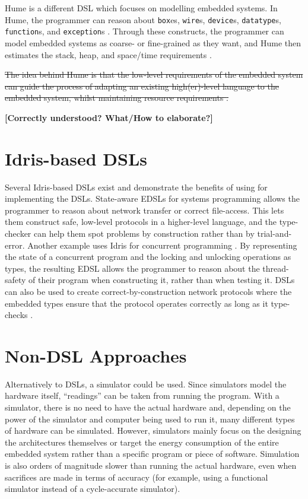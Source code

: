 	Hume \cite{10.1007/978-3-540-39815-8_3} is a different DSL which focuses on modelling embedded systems. In Hume, the programmer can reason about \texttt{box}es, \texttt{wire}s, \texttt{device}s, \texttt{datatype}s, \texttt{function}s, and \texttt{exception}s \cite{10.1007/978-3-540-39815-8_3}. Through these constructs, the programmer can model embedded systems as coarse- or fine-grained as they want, and Hume then estimates the stack, heap, and space/time requirements \cite{10.1007/978-3-540-39815-8_3}.
    
    \sout{The idea behind Hume is that the low-level requirements of the embedded system can guide the process of adapting an existing high(er)-level language to the embedded system, whilst maintaining resource requirements \cite{10.1007/978-3-540-39815-8_3}.}
    
    \textbf{[Correctly understood? What/How to elaborate?]}

\section{Idris-based DSLs}
	Several Idris-based DSLs exist and demonstrate the benefits of using \Idris for implementing the DSLs. State-aware EDSLs for systems programming \cite{10.1007/978-3-642-27694-1_18} allows the programmer to reason about network transfer or correct file-access. This lets them construct safe, low-level protocols in a higher-level language, and the type-checker can help them spot problems by construction \cite{10.1007/978-3-642-27694-1_18} rather than by trial-and-error.
	Another example uses Idris for concurrent programming \cite{brady2010correct}. By representing the state of a concurrent program and the locking and unlocking operations as types, the resulting EDSL allows the programmer to reason about the thread-safety of their program when constructing it, rather than when testing it.
	DSLs can also be used to create correct-by-construction network protocols where the embedded types ensure that the protocol operates correctly as long as it type-checks \cite{5158855}.

\section{Non-DSL Approaches}
	Alternatively to DSLs, a simulator could be used. Since simulators model the hardware itself, ``readings'' can be taken from running the program. With a simulator, there is no need to have the actual hardware and, depending on the power of the simulator and computer being used to run it, many different types of hardware can be simulated. However, simulators mainly focus on the designing the architectures themselves \cite{10.1007/3-540-46002-0_32,Lee:2008:FFC:1375657.1375670} or target the energy consumption of the entire embedded system \cite{782199} rather than a specific program or piece of software. Simulation is also orders of magnitude slower than running the actual hardware, even when sacrifices are made in terms of accuracy (for example, using a functional simulator instead of a cycle-accurate simulator).


